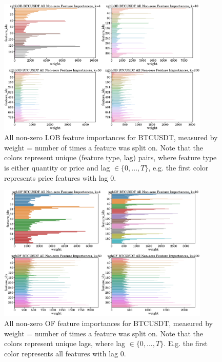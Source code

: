 \begin{figure}[htpb!]
    \centering
    \includegraphics[width=0.9\textwidth]{./images/xgboost_LOB_BTCUSDT_all_feature_importances.pdf}
    \caption{All non-zero LOB feature importances for BTCUSDT, measured by weight = number of times a feature was split on.
    Note that the colors represent unique (feature type, lag) pairs, where feature type is either quantity or price and lag $\in \{0, ..., T\} $,
    e.g. the first color represents price features with lag 0.}
    \label{all_lob_features}
\end{figure}

\begin{figure}[htpb!]
    \centering
    \includegraphics[width=0.9\textwidth]{./images/xgboost_OF_BTCUSDT_all_feature_importances.pdf}
    \caption{All non-zero OF feature importances for BTCUSDT, measured by weight = number of times a feature was split on.
    Note that the colors represent unique lags, where lag $\in \{0, ..., T\} $. 
    E.g. the first color represents all features with lag 0.}
    \label{all_of_features}
\end{figure}

